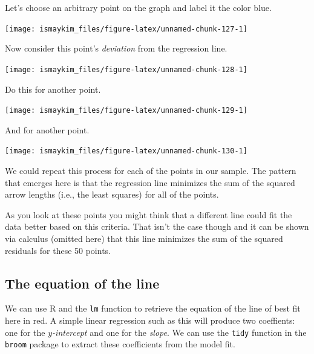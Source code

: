 \documentclass[]{tufte-book}
\newenvironment{Shaded}{\begin{snugshade}}{\end{snugshade}}
\newcommand{\KeywordTok}[1]{\textcolor[rgb]{0.13,0.29,0.53}{\textbf{{#1}}}}
\newcommand{\DataTypeTok}[1]{\textcolor[rgb]{0.13,0.29,0.53}{{#1}}}
\newcommand{\StringTok}[1]{\textcolor[rgb]{0.31,0.60,0.02}{{#1}}}
\newcommand{\NormalTok}[1]{{#1}}
\begin{document}
Let's choose an arbitrary point on the graph and label it the color
blue.

\begin{center}\texttt{[image: ismaykim\_files/figure-latex/unnamed-chunk-127-1]} \end{center}

Now consider this point's \emph{deviation} from the regression line.

\begin{center}\texttt{[image: ismaykim\_files/figure-latex/unnamed-chunk-128-1]} \end{center}

Do this for another point.

\begin{center}\texttt{[image: ismaykim\_files/figure-latex/unnamed-chunk-129-1]} \end{center}

And for another point.

\begin{center}\texttt{[image: ismaykim\_files/figure-latex/unnamed-chunk-130-1]} \end{center}

We could repeat this process for each of the points in our sample. The
pattern that emerges here is that the regression line minimizes the sum
of the squared arrow lengths (i.e., the least squares) for all of the
points.

As you look at these points you might think that a different line could
fit the data better based on this criteria. That isn't the case though
and it can be shown via calculus (omitted here) that this line minimizes
the sum of the squared residuals for these 50 points.

\subsection{The equation of the line}\label{the-equation-of-the-line}

We can use R and the \texttt{lm} function to retrieve the equation of
the line of best fit here in red. A simple linear regression such as
this will produce two coeffients: one for the \emph{\(y\)-intercept} and
one for the \emph{slope}. We can use the \texttt{tidy} function in the
\texttt{broom} package to extract these coefficients from the model fit.

\begin{Shaded}
\end{Shaded}
\end{document}
